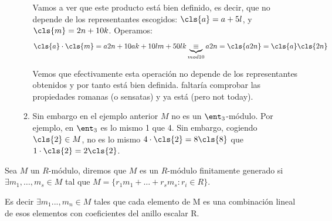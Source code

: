 \begin{example}
\begin{itemize}
\begin{enumerate}
		Vamos a ver que este producto está bien definido, es decir, que no depende de los representantes escogidos: $\cls{a}=a+5l$, y $\cls{m}=2n+10k$. Operamos:
		$$\cls{a}\cdot \cls{m}=a2n+10ak+10lm+50lk \underbrace{\equiv}_{mod 10} a2n=\cls{a2n}=\cls{a}\cls{2n}$$

		Vemos que efectivamente esta operación no depende de los representantes obtenidos y por tanto está bien definida. faltaría comprobar las propiedades romanas (o sensatas) y ya está (pero not today).
		\item Sin embargo en el ejemplo anterior $M$ no es un $\ent_3$-módulo. Por ejemplo, en $\ent_3$ es lo mismo 1 que 4. Sin embargo, cogiendo $\cls{2}\in M$, no es lo mismo $4\cdot\cls{2}=8\cls{8}$ que $1\cdot\cls{2}=2\cls{2}$.
	\end{enumerate}
	\end{itemize}
\end{example}

\begin{defn}\label{def:rmodulo_fg}
	Sea $M$ un $R$-módulo, diremos que $M$ es un $R$-módulo finitamente generado si $\exists m_1,\dots,m_s \in M$ tal que $M=\{r_1m_1+\dots+r_sm_s: r_i \in R \}$.

	Es decir $\exists m_1..., m_n \in M$ tales que cada elemento de M es una combinación lineal de esos elementos con coeficientes del anillo escalar R.
\end{defn}

